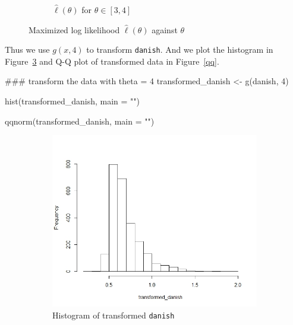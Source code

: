 \documentclass{article}
\begin{document}
\begin{enumerate}[leftmargin = 0 em, label = \arabic*., font = \bfseries]
\begin{enumerate}
\begin{enumerate}
\begin{figure}[!htb]
\begin{subfigure}[b]{0.4\textwidth}
	 	\caption{$\hat{\ell}(\theta)$ for $\theta \in [3,4]$}
	 	\label{ltheta34}
	 	\end{subfigure}
	    \caption{Maximized log likelihood $\hat{\ell}(\theta)$ against $\theta$}
	 \end{figure}
	\newpage
Thus we use $g(x, 4)$ to transform \verb|danish|. And we plot the histogram in Figure~\ref{histg} and Q-Q plot of transformed data in Figure~\ref{qq}. 

\begin{rcode}
### transform the data with theta = 4
transformed_danish <- g(danish, 4)

hist(transformed_danish, main = "")

qqnorm(transformed_danish, main = "")
\end{rcode}

\begin{figure}[!htb]
     \centering
 	\begin{subfigure}[b]{0.4\textwidth}
 	\includegraphics[width = \textwidth]{histg.jpeg}
 	\caption{Histogram of transformed \texttt{danish}}
 	\label{histg}
 	\end{subfigure}%
 	\begin{subfigure}[b]{0.4\textwidth}

\end{subfigure}
\end{figure}
\end{enumerate}
\end{enumerate}
\end{enumerate}
\end{document}
